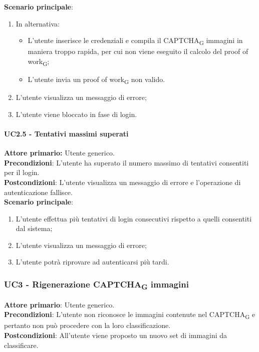 \textbf{Scenario principale}:
\begin{enumerate}
    \item In alternativa:
    \begin{itemize}
        \item L'utente inserisce le credenziali e compila il CAPTCHA\textsubscript{G} immagini in maniera troppo rapida, per cui non viene eseguito il calcolo del proof of work\textsubscript{G};
        \item L'utente invia un proof of work\textsubscript{G} non valido.
    \end{itemize}
	\item L’utente visualizza un messaggio di errore;
	\item L'utente viene bloccato in fase di login.
\end{enumerate}

\paragraph{UC2.5 - Tentativi massimi superati}
\textbf{Attore primario:} Utente generico.\\
\textbf{Precondizioni}: L'utente ha superato il numero massimo di tentativi consentiti per il login.\\
\textbf{Postcondizioni}: L’utente visualizza un messaggio di errore e l’operazione di autenticazione fallisce.\\

\textbf{Scenario principale}:
\begin{enumerate}
    \item L'utente effettua più tentativi di login consecutivi rispetto a quelli consentiti dal sistema;
	\item L’utente visualizza un messaggio di errore;
	\item L'utente potrà  riprovare ad autenticarsi più tardi.
\end{enumerate}

\subsubsection{UC3 - Rigenerazione CAPTCHA\textsubscript{G} immagini}
\textbf{Attore primario}: Utente generico.\\
\textbf{Precondizioni}: L'utente non riconosce le immagini contenute nel CAPTCHA\textsubscript{G} e pertanto non può procedere con la loro classificazione.\\
\textbf{Postcondizioni}: All'utente viene proposto un nuovo set di immagini da classificare.\\

